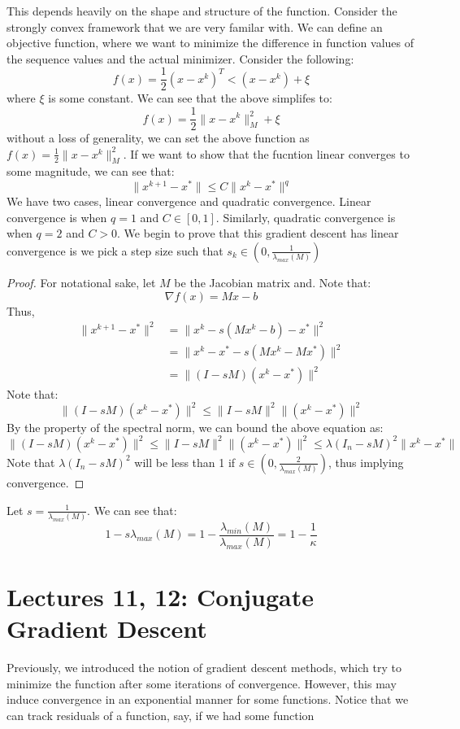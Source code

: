 \documentclass[11pt]{article}
\theoremstyle{definition}
\begin{document}
This depends heavily on the shape and structure of the function. Consider the strongly convex framework that we are very familar with. We can define an objective function, where we want to minimize the difference in function values of the sequence values and the actual minimizer. Consider the following:
\[
f(x) = \frac{1}{2}(x-x^k)^T < (x - x^k) + \xi 
\]
where $\xi$ is some constant. We can see that the above simplifes to:
\[
f(x) = \frac{1}{2}\|x - x^k\|^2_M + \xi
\]
without a loss of generality, we can set the above function as $f(x) = \frac{1}{2}\|x-x^k\|^2_M$. If we want to show that the fucntion linear converges to some magnitude, we can see that:
\[
\|x^{k+1} - x^*\| \leq C \|x^k - x^*\|^q
\]
We have two cases, linear convergence and quadratic convergence. Linear convergence is when $q = 1$ and $C \in [0,1]$. Similarly, quadratic convergence is when $q = 2$ and $C > 0$. We begin to prove that this gradient descent has linear convergence is we pick a step size such that $s_k \in (0, \frac{1}{\lambda_{max}(M)})$ 
\begin{proof}
  For notational sake, let $M$ be the Jacobian matrix and. Note that:
  \[
  \nabla f(x) = Mx - b
  \]
  Thus, 
  \begin{align*}
    \|x^{k+1} - x^*\|^2 &= \|x^k - s(Mx^k - b) - x^*\|^2\\
    &= \|x^k - x^* -s(Mx^k - Mx^*)\|^2\\
    &= \|(I - sM)(x^k - x^*)\|^2
  \end{align*}
  Note that:
  \[
  \|(I - sM)(x^k - x^*)\|^2 \leq \|I - sM\|^2 \|(x^k - x^*)\|^2
  \]
  By the property of the spectral norm, we can bound the above equation as:
  \[
    \|(I - sM)(x^k - x^*)\|^2 \leq \|I - sM\|^2 \|(x^k - x^*)\|^2 \leq \lambda(I_n - sM)^2 \|x^k - x^*\| 
  \]
  Note that $\lambda(I_n - sM)^2$ will be less than 1 if $s \in (0 , \frac{2}{\lambda_{max}(M)})$, thus implying convergence. 
\end{proof}
Let $s = \frac{1}{\lambda_{max}(M)}$. We can see that:
\[
1 - s\lambda_{max}(M) = 1 - \frac{\lambda_{min}(M)}{\lambda_{max}(M)} = 1 - \frac{1}{\kappa}
\]
\section{Lectures 11, 12: Conjugate Gradient Descent}
Previously, we introduced the notion of gradient descent methods, which try to minimize the function after some iterations of convergence. However, this may induce convergence in an exponential manner for some functions. Notice that we can track residuals of a function, say, if we had some function  
\end{document}
